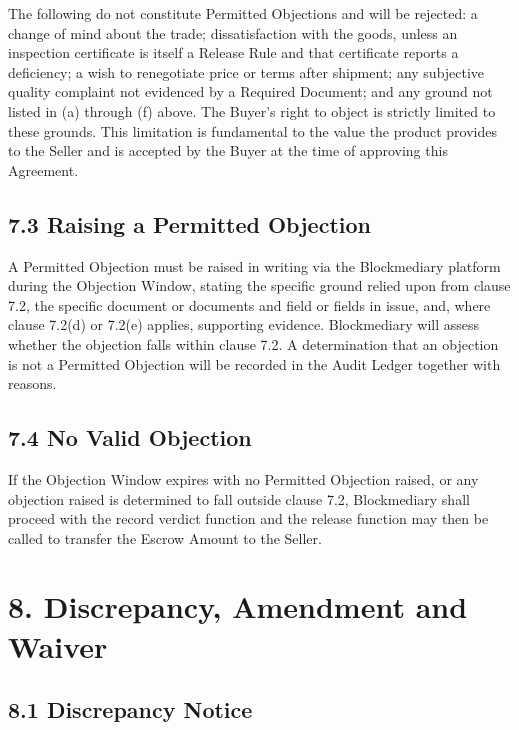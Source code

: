 \documentclass[12pt, a4paper]{article}
\begin{document}
The following do not constitute Permitted Objections and will be rejected: a change of
mind about the trade; dissatisfaction with the goods, unless an inspection certificate is
itself a Release Rule and that certificate reports a deficiency; a wish to renegotiate
price or terms after shipment; any subjective quality complaint not evidenced by a
Required Document; and any ground not listed in (a) through (f) above. The Buyer's right
to object is strictly limited to these grounds. This limitation is fundamental to the
value the product provides to the Seller and is accepted by the Buyer at the time of
approving this Agreement.

\subsection*{7.3 Raising a Permitted Objection}

A Permitted Objection must be raised in writing via the Blockmediary platform during the
Objection Window, stating the specific ground relied upon from clause 7.2, the specific
document or documents and field or fields in issue, and, where clause 7.2(d) or 7.2(e)
applies, supporting evidence. Blockmediary will assess whether the objection falls within
clause 7.2. A determination that an objection is not a Permitted Objection will be
recorded in the Audit Ledger together with reasons.

\subsection*{7.4 No Valid Objection}

If the Objection Window expires with no Permitted Objection raised, or any objection
raised is determined to fall outside clause 7.2, Blockmediary shall proceed with the
record verdict function and the release function may then be called to transfer the
Escrow Amount to the Seller.

\section*{8. Discrepancy, Amendment and Waiver}

\subsection*{8.1 Discrepancy Notice}
\end{document}
